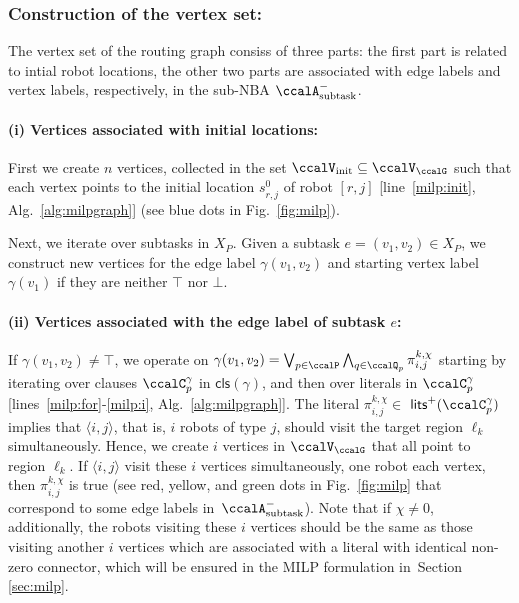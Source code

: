 \documentclass[Afour,sageh,times]{sagej}
\newcommand{\clause}[1]{\mathsf{cls}(#1)}
\newcommand{\auto}[1]{\ccalA_{\text{#1}}}
\newcommand{\ag}[2]{\langle#1,#2\rangle}
\renewcommand{\ap}[3]{\mathcal{\pi}_{{#1},{#2}}^{#3}}
\begin{document}
\subsubsection{Construction of the vertex set:}\label{sec:vertex} The vertex set of the routing graph  consiss of three parts: the first part is related to intial robot locations, the other two parts are associated with edge labels and vertex labels, respectively, in the sub-NBA $\auto{subtask}^-$.

\paragraph{(i) Vertices associated with initial locations:} First we create $n$ vertices, collected in the set $\ccalV_{\text{init}}\subseteq \ccalV_{\ccalG}$ such that each vertex points to the initial location $s^0_{r,j}$ of robot $[r,j]$ [line~\ref{milp:init}, Alg.~\ref{alg:milpgraph}] (see blue dots in Fig.~\ref{fig:milp}).

Next, we iterate over subtasks in $X_{P}$. Given a subtask $e = (v_1, v_2) \in X_{P}$, we construct new vertices for the  edge label $\gamma(v_1, v_2)$ and starting vertex label $\gamma(v_1)$ if they are neither $\top$ nor $\bot$.

\paragraph{(ii) Vertices associated with the edge label of subtask $e$:} If $\gamma(v_1, v_2) \not= \top$, we operate on $\gamma(v_1, v_2) =  \bigvee_{p\in \ccalP} \bigwedge_{q \in \ccalQ_{p}} \ap{i}{j}{k,\chi}$ starting by iterating over clauses $\ccalC_p^{\gamma}$ in $\clause{\gamma}$, and then over literals in $\ccalC_p^\gamma$ [lines~\ref{milp:for}-\ref{milp:i}, Alg.~\ref{alg:milpgraph}].
The literal $\ap{i}{j}{k,\chi}\in $ $\mathsf{lits}^+(\ccalC_p^{\gamma})$ implies that $\ag{i}{j}$, that is, $i$ robots of type $j$,  should visit the target region $\ell_k$ simultaneously. Hence, we create $i$ vertices in $\ccalV_\ccalG$  that all point to region $\ell_k$. If $\ag{i}{j}$ visit these $i$ vertices simultaneously, one robot each vertex, then $\ap{i}{j}{k,\chi}$ is true (see red, yellow, and green dots in Fig.~\ref{fig:milp} that correspond to some edge labels in~$\auto{subtask}^-$). Note that if $\chi\not=0$, additionally, the robots visiting these $i$ vertices should be the same as those visiting another $i$ vertices which are associated with a literal with identical non-zero connector, which will be ensured in the MILP formulation in~Section \ref{sec:milp}.
\end{document}
